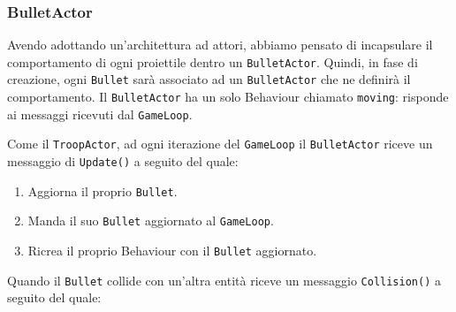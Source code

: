 \subsubsection{BulletActor}
Avendo adottando un'architettura ad attori, abbiamo pensato di incapsulare il comportamento
di ogni proiettile dentro un \texttt{BulletActor}. Quindi, in fase di creazione, ogni \texttt{Bullet} sarà associato ad un
\texttt{BulletActor} che ne definirà il comportamento.
Il \texttt{BulletActor} ha un solo Behaviour chiamato \texttt{moving}: risponde ai messaggi ricevuti dal \texttt{GameLoop}.

Come il \texttt{TroopActor}, ad ogni iterazione del \texttt{GameLoop} il \texttt{BulletActor} riceve un messaggio di \texttt{Update()} a seguito del quale:
\begin{enumerate}
    \item Aggiorna il proprio \texttt{Bullet}.
    \item Manda il suo \texttt{Bullet} aggiornato al \texttt{GameLoop}.
    \item Ricrea il proprio Behaviour con il \texttt{Bullet} aggiornato.
\end{enumerate}
Quando il \texttt{Bullet} collide con un'altra entità riceve un messaggio \texttt{Collision()} a seguito del quale:
